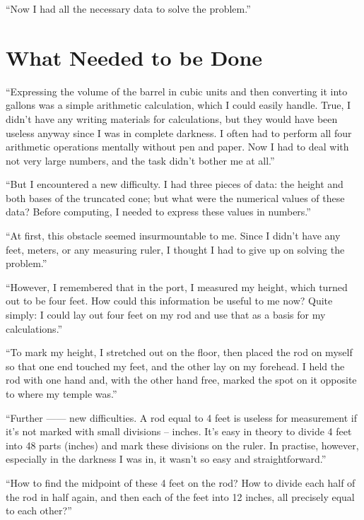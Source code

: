``Now I had all the necessary data to solve the problem.''

\section{What Needed to be Done}
\label{sec-8.4}

``Expressing the volume of the barrel in cubic units and then converting it into gallons was a simple arithmetic calculation, which I could easily handle. True, I didn't have any writing materials for calculations, but they would have been useless anyway since I was in complete darkness. I often had to perform all four arithmetic operations mentally without pen and paper. Now I had to deal with not very large numbers, and the task didn't bother me at all.''

``But I encountered a new difficulty. I had three pieces of data: the height and both bases of the truncated cone; but what were the numerical values of these data? Before computing, I needed to express these values in numbers.''

``At first, this obstacle seemed insurmountable to me. Since I didn't have any feet, meters, or any measuring ruler, I thought I had to give up on solving the problem.''

``However, I remembered that in the port, I measured my height, which turned out to be four feet. How could this information be useful to me now? Quite simply: I could lay out four feet on my rod and use that as a basis for my calculations.''

``To mark my height, I stretched out on the floor, then placed the rod on myself so that one end touched my feet, and the other lay on my forehead. I held the rod with one hand and, with the other hand free, marked the spot on it opposite to where my temple was.''

``Further —— new difficulties. A rod equal to 4 feet is useless for measurement if it's not marked with small divisions -- inches. It's easy in theory to divide 4 feet into 48 parts (inches) and mark these divisions on the ruler. In practise, however, especially in the darkness I was in, it wasn't so easy and straightforward.''

``How to find the midpoint of these 4 feet on the rod? How to divide each half of the rod in half again, and then each of the feet into 12 inches, all precisely equal to each other?''

